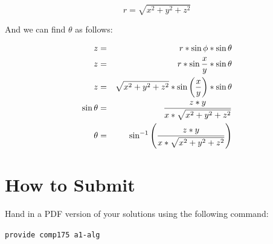 \documentclass[10pt,twocolumn]{article}
\begin{document}
\[ r = \sqrt{x^{2} + y^{2} + z^{2}} \]

And we can find $\theta$ as follows: 

\begin{eqnarray*}
z & = & r * \sin{\phi}*\sin{\theta} \\
z & = & r * \sin{{x}\over{y}}*\sin{\theta} \\
z & = & \sqrt{x^{2} + y^{2} + z^{2}} * \sin\left({{x}\over{y}}\right)*\sin{\theta} \\
\sin{\theta} & = & {z * y}\over{x * \sqrt{x^{2} + y^{2} + z^{2}}} \\
\theta & = & \sin^{-1}\left({{z * y}\over{x * \sqrt{x^{2} + y^{2} + z^{2}}}}\right)
\end{eqnarray*}
\vspace{2em}
\section{How to Submit}

Hand in a PDF version of your solutions using the following command:
\begin{center}
 {\tt provide comp175 a1-alg}
 \end{center}
\end{document}

